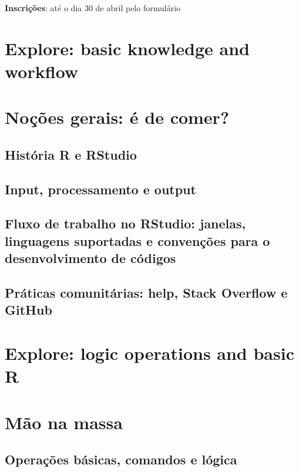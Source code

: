 \documentclass[a4paper,12pt]{article}
\begin{document}
\textbf{Inscrições}: até o dia 30 de abril pelo formulário 



\section{Explore: basic knowledge and workflow}
\section*{Noções gerais: é de comer?}
\subsection*{História R e RStudio}
\subsection*{Input, processamento e output}
\subsection*{Fluxo de trabalho no RStudio: janelas, linguagens suportadas e convenções para o desenvolvimento de códigos}
\subsection*{Práticas comunitárias: help, Stack Overflow e GitHub}

\section{Explore: logic operations and basic R}
\section*{Mão na massa}
\subsection*{Operações básicas, comandos e lógica}
\end{document}
